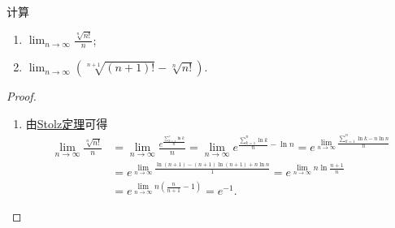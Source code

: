 \documentclass[../../main.tex]{subfiles}
\begin{document}
\begin{example}
计算
\begin{enumerate}
\item \(\lim_{n \to \infty} \frac{\sqrt[n]{n!}}{n}\);
\item \(\lim_{n \to \infty} (\sqrt[n + 1]{(n + 1)!} - \sqrt[n]{n!})\).
\end{enumerate}
\end{example}
\begin{proof}
\begin{enumerate}
\item 由\hyperref[theorem:Stolz定理]{Stolz定理}可得
\begin{align*}
\lim_{n\rightarrow \infty} \frac{\sqrt[n]{n!}}{n}&=\lim_{n\rightarrow \infty} \frac{e^{\frac{\sum\limits_{k=1}^n{\ln k}}{n}}}{n}=\lim_{n\rightarrow \infty} e^{\frac{\sum\limits_{k=1}^n{\ln k}}{n}-\ln n}=e^{\lim\limits_{n\rightarrow \infty} \frac{\sum\limits_{k=1}^n{\ln k}-n\ln n}{n}}
\\
&=e^{\lim\limits_{n\rightarrow \infty} \frac{\ln \left(n+1\right)-\left( n+1 \right) \ln \left( n+1 \right) +n\ln n}{1}}=e^{\lim\limits_{n\rightarrow \infty} n \ln \frac{n+1}{n}}
\\
&=e^{\lim\limits_{n\rightarrow \infty} n\left( \frac{n}{n+1}-1 \right)}=e^{-1}.
\end{align*}


\end{enumerate}
\end{proof}
\end{document}
